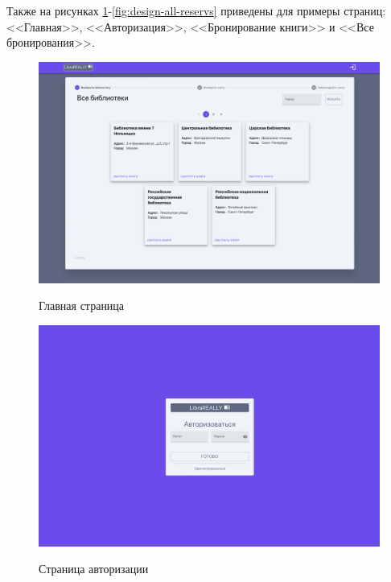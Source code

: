 Также на рисунках \ref{fig:design-main}-\ref{fig:design-all-reservs} приведены для примеры страниц: <<Главная>>, <<Авторизация>>, <<Бронирование книги>> и <<Все бронирования>>.

\begin{figure}[H]
	\begin{center}
		{\includegraphics[scale = 0.25]{../img/design/main.png}}
		\caption{Главная страница}
		\label{fig:design-main}
	\end{center}
\end{figure}

\begin{figure}[H]
	\begin{center}
		{\includegraphics[scale = 0.25]{../img/design/login.png}}
		\caption{Страница авторизации}
		\label{fig:design-auth}
	\end{center}
\end{figure} 

